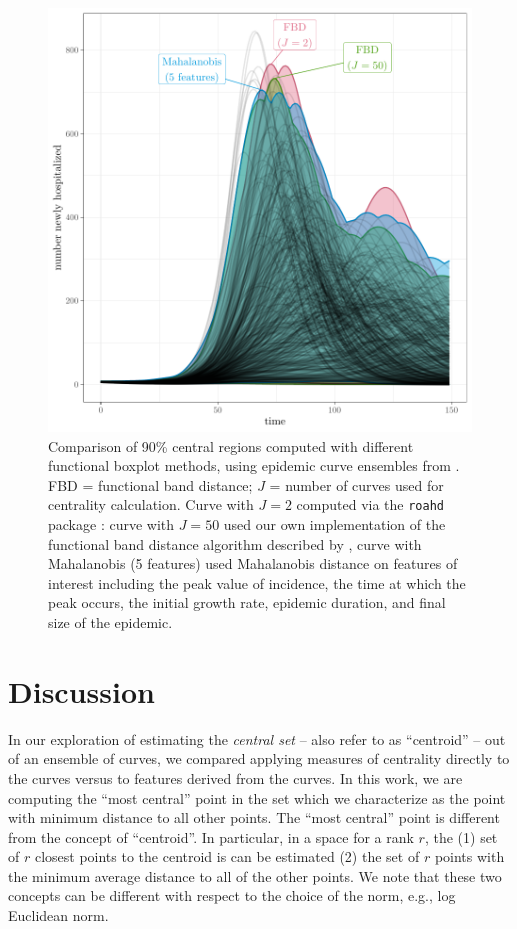 \documentclass[fleqn,10pt,lineno]{wlpeerj}
\begin{document}
\begin{figure}[ht]\centering
  \includegraphics[width=\linewidth]{scripts/cent_plot.pdf}
  \caption{Comparison of 90\% central regions computed with
    different functional boxplot methods, using epidemic curve ensembles from \juul. FBD = functional band distance; $J$ = number of curves used for centrality calculation. Curve with $J=2$ computed via the \texttt{roahd} package \citep{roahd}: curve with $J=50$ used our own implementation of the functional band distance algorithm described by \juul, curve with Mahalanobis (5 features) used Mahalanobis distance on features of interest including the peak value of incidence, the time at which the peak occurs, the initial growth rate, epidemic duration, and final size of the epidemic.
  }
  \label{p.a}
\end{figure}
 
\section*{Discussion}

In our exploration of estimating the \emph{central set} -- also refer to as ``centroid'' -- out of an ensemble of curves, we compared applying measures of centrality directly to the curves versus to features derived from the curves. In this work, we are computing the ``most central'' point in the set which we characterize as the point with minimum distance to all other points. The ``most central'' point is different from the concept of ``centroid''. In particular, in a space for a rank $r$, the (1) set of $r$ closest points to the centroid is can be estimated (2) the set of $r$ points with the minimum average distance to all of the other points. We note that these two concepts can be different with respect to the choice of the norm, e.g., log Euclidean norm.
\end{document}
